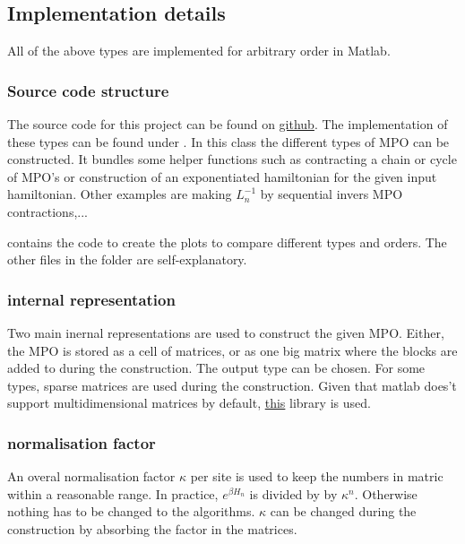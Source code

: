 
\subsection{Implementation details}

All of the above types are implemented for arbitrary order in Matlab.

\subsubsection{Source code structure}

The source code for this project can be found on \href{https://github.com/DavidDevoogdt/Thesis_Tensor_Networks}{github}. The implementation of these types can be found under . In this class the different types of MPO can be constructed. It bundles some helper functions such as contracting a chain or cycle of MPO's or construction of an exponentiated hamiltonian for the given input hamiltonian. Other examples are making $L_n^{-1}$ by sequential invers MPO contractions,...

  contains the code to create the plots to compare different types and orders. The other files in the folder are self-explanatory.

\subsubsection{internal representation}

Two main inernal representations are used to construct the given MPO. Either, the MPO is stored as a cell of matrices, or as one big matrix where the blocks are added to during the construction. The output type can be chosen. For some types, sparse matrices are used during the construction. Given that matlab does't support multidimensional matrices by default, \href{https://nl.mathworks.com/matlabcentral/fileexchange/29832-n-dimensional-sparse-arrays}{this} library is used.

\subsubsection{normalisation factor}

An overal normalisation factor $\kappa$ per site is used to keep the numbers in matric within a reasonable range. In practice, $e^{\beta H_n}$ is divided by by $\kappa^n$. Otherwise nothing has to be changed to the algorithms. $\kappa$ can be changed during the construction by absorbing the factor in the matrices.

